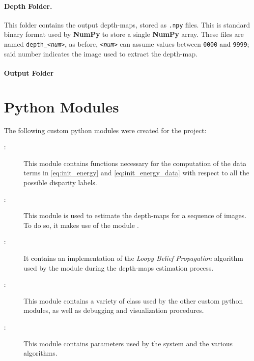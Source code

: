 \documentclass[notitlepage,english]{hgbreport}
\begin{document}
\paragraph{Depth Folder.} This folder contains the output depth-maps, stored as \texttt{.npy} files. This is standard binary format used by \textbf{NumPy} to store a single \textbf{NumPy} array. These files are named \texttt{depth\_\textit{<num>}}, as before,  \texttt{\textit{<num>}} can assume values between \texttt{0000} and \texttt{9999}; said number indicates the image used to extract the depth-map.

\paragraph{Output Folder}


\section{Python Modules}
The following custom python modules were created for the project:
\begin{description}
	\item[\ComputeEnergy:] This module contains functions necessary for the computation of the data terms in \cref{eq:init_energy} and \cref{eq:init_energy_data} with respect to all the possible disparity labels.
	\item[\Estimate:] This module is used to estimate the depth-maps for a sequence of images. To do so, it makes use of the module \ComputeEnergy{}.
	\item[\Lbp:] It contains an implementation of the \emph{Loopy Belief Propagation} algorithm used by the \Estimate{} module during the depth-maps estimation process.
	\item[\Utils:] This module contains a variety of class used by the other custom python modules, as well as debugging and visualization procedures.
	\item[\Params:] This module contains parameters used by the system and the various algorithms.
\end{description}

\end{document}
